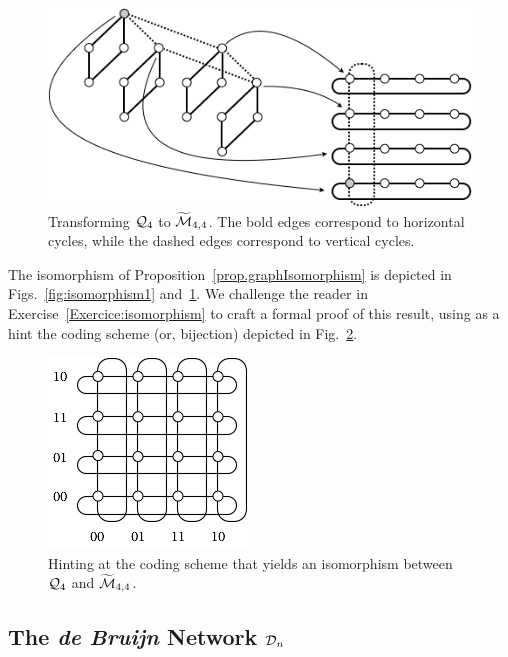 \begin{figure}[hbt]
\begin{center}
       \includegraphics[scale=0.5]{FiguresGraph/Isomorphism2}
       \caption{Transforming $\mbox{$\cal Q$}_4$ to $\widetilde{\mbox{$\cal M$}}_{4,4}$.  The bold edges correspond to horizontal cycles, while the dashed edges correspond to vertical cycles.}
  \label{fig:isomorphism2}
\end{center}
\end{figure}

The isomorphism of Proposition~\ref{prop.graphIsomorphism} is depicted in Figs.~\ref{fig:isomorphism1} and~\ref{fig:isomorphism2}.  We challenge the reader in Exercise~\ref{Exercice:isomorphism} to craft a formal proof of this result, using as a hint the coding scheme (or, bijection) depicted in Fig.~\ref{fig:toruslabel}.
\begin{figure}[hbt]
\begin{center}
       \includegraphics[scale=0.6]{FiguresGraph/toruslabel}
\caption{Hinting at the coding scheme that yields an isomorphism between $\mbox{$\cal Q$}_4$ and $\widetilde{\mbox{$\cal M$}}_{4,4}$.}
  \label{fig:toruslabel}
\end{center}
\end{figure}


\subsection{The {\it de Bruijn} Network $\mbox{$\cal D$}_n$}
\label{sec:deBruijn}

